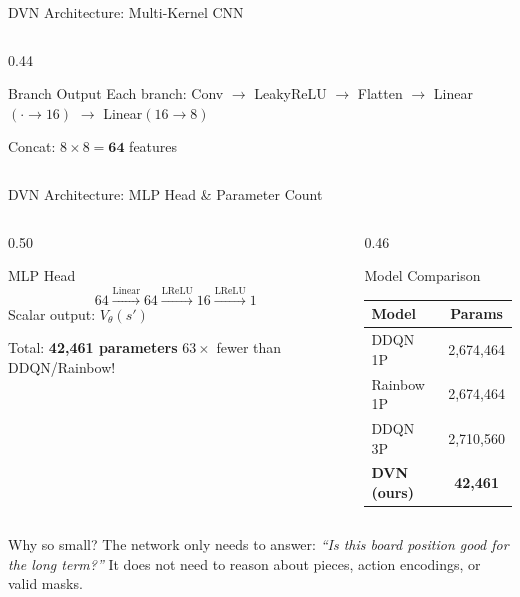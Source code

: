 \documentclass[aspectratio=169,10pt]{beamer}
\begin{document}
\begin{frame}{DVN Architecture: Multi-Kernel CNN}
\begin{columns}[T]
\begin{column}{0.44\textwidth}
\vspace{0.4em}
\begin{block}{Branch Output}
Each branch: Conv $\to$ LeakyReLU $\to$ Flatten $\to$ Linear$(\cdot\to16)$ $\to$ Linear$(16\to8)$

\vspace{0.3em}
Concat: $8 \times 8 = \mathbf{64}$ features
\end{block}
\end{column}
\end{columns}
\end{frame}

\begin{frame}{DVN Architecture: MLP Head \& Parameter Count}
\begin{columns}[T]
\begin{column}{0.50\textwidth}
\begin{block}{MLP Head}
\[
64 \xrightarrow{\text{Linear}} 64 \xrightarrow{\text{LReLU}} 16 \xrightarrow{\text{LReLU}} 1
\]
Scalar output: $V_\theta(s')$
\end{block}

\vspace{0.5em}
\begin{exampleblock}{Total: \textbf{42,461 parameters}}
$63\times$ fewer than DDQN/Rainbow!
\end{exampleblock}
\end{column}

\begin{column}{0.46\textwidth}
\begin{block}{Model Comparison}
\begin{tabular}{lc}
\toprule
Model & Params \\
\midrule
DDQN 1P   & 2,674,464 \\
Rainbow 1P & 2,674,464 \\
DDQN 3P   & 2,710,560 \\
\midrule
\textbf{DVN (ours)} & \textbf{42,461} \\
\bottomrule
\end{tabular}
\end{block}
\end{column}
\end{columns}

\vspace{0.5em}
\begin{exampleblock}{Why so small?}
The network only needs to answer: \emph{``Is this board position good for the long term?''} It does not need to reason about pieces, action encodings, or valid masks.
\end{exampleblock}
\end{frame}
\end{document}
